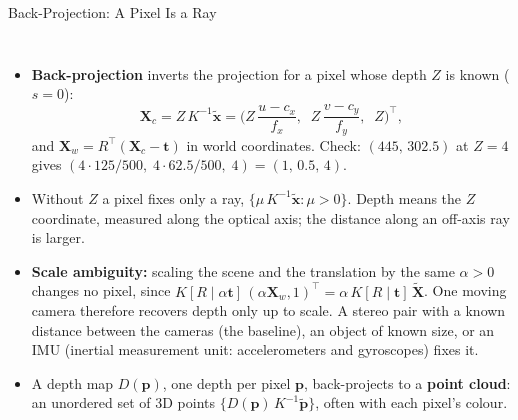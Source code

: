 \begin{frame}{Back-Projection: A Pixel Is a Ray}
  \begin{columns}[T,onlytextwidth]
      \begin{itemize}\footnotesize\itemsep0.3em
        \item \textbf{Back-projection} inverts the projection for a pixel whose depth $Z$ is known ($s=0$):
        \[ \mathbf{X}_c = Z\,K^{-1}\tilde{\mathbf{x}} = \Big(Z\,\frac{u-c_x}{f_x},\;\; Z\,\frac{v-c_y}{f_y},\;\; Z\Big)^{\!\top}, \]
        and $\mathbf{X}_w = R^\top(\mathbf{X}_c-\mathbf{t})$ in world coordinates. Check: $(445,\,302.5)$ at $Z=4$ gives $(4\cdot125/500,\;4\cdot62.5/500,\;4)=(1,\,0.5,\,4)$.
        \item Without $Z$ a pixel fixes only a ray, $\{\mu\,K^{-1}\tilde{\mathbf{x}}:\mu>0\}$. Depth means the $Z$ coordinate, measured along the optical axis; the distance along an off-axis ray is larger.
        \item \textbf{Scale ambiguity:} scaling the scene and the translation by the same $\alpha>0$ changes no pixel, since $K[R\mid\alpha\mathbf{t}]\,(\alpha\mathbf{X}_w,1)^\top=\alpha\,K[R\mid\mathbf{t}]\,\tilde{\mathbf{X}}$. One moving camera therefore recovers depth only up to scale. A stereo pair with a known distance between the cameras (the baseline), an object of known size, or an IMU (inertial measurement unit: accelerometers and gyroscopes) fixes it.
        \item A depth map $D(\mathbf{p})$, one depth per pixel $\mathbf{p}$, back-projects to a \textbf{point cloud}: an unordered set of 3D points $\{D(\mathbf{p})\,K^{-1}\tilde{\mathbf{p}}\}$, often with each pixel's colour.
      \end{itemize}
      \centering
\end{columns}
\end{frame}
